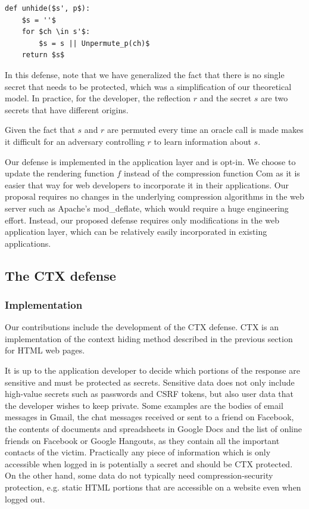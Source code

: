 \documentclass[conference, letterpaper, 10pt]{IEEEtran}
\begin{document}
\begin{lstlisting}[texcl,mathescape,basicstyle=\small]
def unhide($s', p$):
    $s = ''$
    for $ch \in s'$:
        $s = s || Unpermute_p(ch)$
    return $s$
\end{lstlisting}

In this defense, note that we have generalized the fact that there is no single
secret that needs to be protected, which was a simplification of our
theoretical model. In practice, for the developer, the reflection $r$ and the
secret $s$ are two secrets that have different origins.

Given the fact that $s$ and $r$ are permuted every time an oracle call is made
makes it difficult for an adversary controlling $r$ to learn information about
$s$.

Our defense is implemented in the application layer and is opt-in. We choose to
update the rendering function $f$ instead of the compression function
$\textrm{Com}$ as it is easier that way for web developers to incorporate it in
their applications. Our proposal requires no changes in the underlying
compression algorithms in the web server such as Apache's mod\_deflate, which
would require a huge engineering effort. Instead, our proposed defense requires
only modifications in the web application layer, which can be relatively easily
incorporated in existing applications.

\subsection{The CTX defense}\label{subsec:ctx}

\subsubsection{Implementation}
Our contributions include the development of the CTX defense. CTX is an
implementation of the context hiding method described in the previous section
for HTML web pages.

It is up to the application developer to decide which portions of the response
are sensitive and must be protected as secrets. Sensitive data does not only
include high-value secrets such as passwords and CSRF tokens, but also user data
that the developer wishes to keep private. Some examples are the bodies of email
messages in Gmail, the chat messages received or sent to a friend on Facebook,
the contents of documents and spreadsheets in Google Docs and the list of online
friends on Facebook or Google Hangouts, as they contain all the important
contacts of the victim. Practically any piece of information which is only
accessible when logged in is potentially a secret and should be CTX protected.
On the other hand, some data do not typically need compression-security
protection, e.g. static HTML portions that are accessible on a website even when
logged out.
\end{document}
